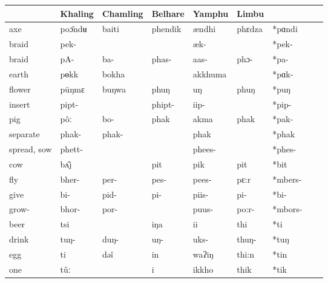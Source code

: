 \documentclass[xcolor=table]{beamer}
\newcommand{\ipa}[1]{{\phon \mbox{#1}}} %
\begin{document}
 \begin{frame} 
\tiny
\begin{table}[h]
\begin{tabular}{lllllllll}
\toprule
  & 	Khaling  & 	Chamling  & 	Belhare  & 	Yamphu  & 	Limbu  & 	  & 	\\	
  \midrule
axe  & 	\ipa{poɔ̄ndʉ} &	\ipa{baiti} &	\ipa{phendik} &	\ipa{ændhi} &	\ipa{phɛdza} &	\ipa{*pɑndi} &	\\	
braid  & 	\ipa{pek-} &	\ipa{} &	\ipa{} &	\ipa{æk-} &	\ipa{} &	\ipa{*pek-} &	\\	
braid  & 	\ipa{pA-} &	\ipa{ba-} &	\ipa{phas-} &	\ipa{aas-} &	\ipa{phɔ-} &	\ipa{*pa-} &	\\	
earth  & 	\ipa{pɵkk} &	\ipa{bokha} &	\ipa{} &	\ipa{akkhuma} &	\ipa{} &	\ipa{*pɑk-} &	\\	
flower  & 	\ipa{pūŋmɛ} &	\ipa{buŋwa} &	\ipa{phuŋ} &	\ipa{uŋ} &	\ipa{phuŋ} &	\ipa{*puŋ} &	\\	
insert  & 	\ipa{pipt-} &	\ipa{} &	\ipa{phipt-} &	\ipa{iip-} &	\ipa{} &	\ipa{*pip-} &	\\	
pig  & 	\ipa{pôː} &	\ipa{bo-} &	\ipa{phak} &	\ipa{akma} &	\ipa{phak} &	\ipa{*pak-} &	\\	
  \midrule
separate  & 	\ipa{phak-} &	\ipa{phak-} &	\ipa{} &	\ipa{phak} &	\ipa{} &	\ipa{*phak} &	\\	
spread, sow  & 	\ipa{phett-} &	\ipa{} &	\ipa{} &	\ipa{phees-} &	\ipa{} &	\ipa{*phes-} &	\\	
  \midrule
cow  & 	\ipa{bʌ̂j} &	\ipa{} &	\ipa{pit} &	\ipa{pik} &	\ipa{pit} &	\ipa{*bit} &	\\	
fly  & 	\ipa{bher-} &	\ipa{per-} &	\ipa{pes-} &	\ipa{pees-} &	\ipa{pɛ:r} &	\ipa{*mbers-} &	\\	
give  & 	\ipa{bi-} &	\ipa{pid-} &	\ipa{pi-} &	\ipa{piis-} &	\ipa{pi-} &	\ipa{*bi-} &	\\	
grow-  & 	\ipa{bhor-} &	\ipa{por-} &	\ipa{} &	\ipa{puus-} &	\ipa{po:r-} &	\ipa{*mbors-} &	\\	
  \midrule
beer  & 	\ipa{tsi} &	\ipa{} &	\ipa{iŋa} &	\ipa{ii} &	\ipa{thi} &	\ipa{*ti} &	\\	
drink  & 	\ipa{tuŋ-} &	\ipa{duŋ-} &	\ipa{uŋ-} &	\ipa{uks-} &	\ipa{thuŋ-} &	\ipa{*tuŋ} &	\\	
egg  & 	\ipa{ti} &	\ipa{dəî} &	\ipa{in} &	\ipa{waʔiŋ} &	\ipa{thi:n} &	\ipa{*tin} &	\\	
one  & 	\ipa{tûː} &	\ipa{} &	\ipa{i} &	\ipa{ikkho} &	\ipa{thik} &	\ipa{*tik} &	\\	

\end{tabular}
\end{table}
\end{frame}
\end{document}
